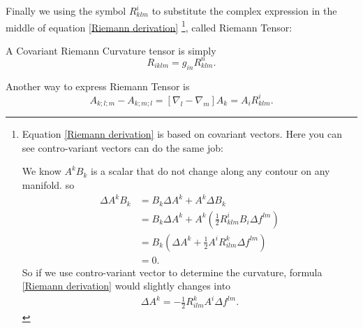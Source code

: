 \documentclass[openany,10pt]{book}
\theoremstyle{definition}
\theoremstyle{definition}
\theoremstyle{remark}
\begin{document}
Finally we using the symbol $R^i_{klm}$ to substitute the complex expression in the middle of equation \ref{Riemann derivation}
\footnote{Equation \ref{Riemann derivation} is based on covariant vectors.  Here you can see contro-variant vectors can do the same job:

We know $A^kB_k$ is a scalar that do not change along any contour on any manifold. so
\begin{equation}\begin{aligned}
        \Delta A^kB_k&=B_k\Delta A^k+A^k\Delta B_k\\
        &=B_k\Delta A^k+A^k\left(\frac12R^i_{klm}B_i\Delta f^{lm}\right)\\
        &=B_k\left(\Delta A^k+\frac12A^iR^k_{ilm}\Delta f^{lm}\right)\\
        &=0.
\end{aligned}
\end{equation}
So if we use contro-variant vector to determine the curvature, formula \ref{Riemann derivation} would slightly changes into
\begin{equation}\begin{aligned}
    \Delta A^k=-\frac12 R^k_{ilm}A^i\Delta f^{lm}.
\end{aligned}
\end{equation}}, called Riemann Tensor:
 
 A Covariant Riemann Curvature tensor is simply
 \begin{equation}
     R_{iklm}=g_{in}R^n_{klm}.
 \end{equation}

Another way to express Riemann Tensor is
\begin{equation}
    A_{k;l;m}-A_{k;m;l}=\left[\nabla_l-\nabla_m\right]A_k=A_i R^i_{klm}.
\end{equation}
\end{document}
